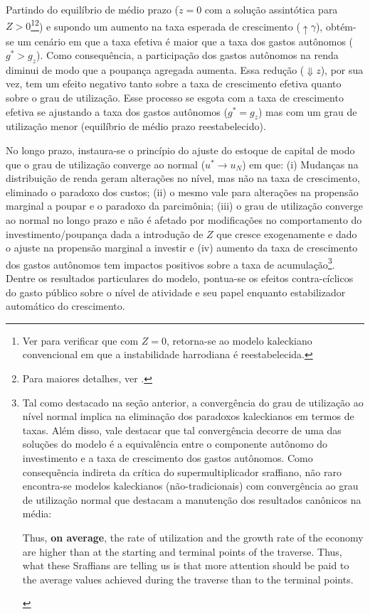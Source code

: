 Partindo do equilíbrio de médio prazo ($\dot z = 0$ com a solução assintótica para $Z >0$\footnote{Ver \textcite[Apêndice A]{allain_tackling_2015} para verificar que com $Z = 0$, retorna-se ao modelo kaleckiano convencional em que a instabilidade harrodiana é reestabelecida.}\footnote{Para maiores detalhes, ver \textcite{fagundes_role_2017}.}) e supondo um aumento na taxa esperada de crescimento ($\uparrow\gamma$), obtém-se um cenário em que a taxa efetiva é maior que a taxa dos gastos autônomos ($g^* > g_z$). Como consequência, a participação dos gastos autônomos na renda diminui de modo que  a poupança agregada aumenta. Essa redução ($\Downarrow z$), por sua vez, tem um efeito negativo tanto sobre a taxa de crescimento efetiva quanto sobre o grau de utilização. Esse processo se esgota com a taxa de crescimento efetiva se ajustando a taxa dos gastos autônomos ($g^* = g_z$) mas com um grau de utilização menor  (equilíbrio de médio prazo reestabelecido). 

No longo prazo, instaura-se o princípio do ajuste do estoque de capital de modo que o grau de utilização converge ao normal ($u^* \to u_N$) em que: (i) Mudanças na distribuição de renda geram alterações no nível, mas não na taxa de crescimento, eliminado o paradoxo dos custos; (ii) o mesmo vale para alterações na propensão marginal a poupar e o paradoxo da parcimônia; (iii) o grau de utilização converge ao normal no longo prazo e não é afetado por modificações no comportamento do investimento/poupança dada a introdução de $Z$ que cresce exogenamente e dado o ajuste na propensão marginal a investir e (iv) aumento da taxa de crescimento dos gastos autônomos tem impactos positivos sobre a taxa de acumulação\footnote{
	Tal como destacado na seção anterior, a convergência do grau de utilização ao nível normal implica na eliminação dos paradoxos kaleckianos em termos de taxas. Além disso, vale destacar que tal convergência decorre de uma das soluções do modelo é a equivalência entre o componente autônomo do investimento e a taxa de crescimento dos gastos autônomos. Como consequência indireta da crítica do supermultiplicador sraffiano, não raro encontra-se modelos kaleckianos (não-tradicionais) com convergência ao grau de utilização normal que destacam a manutenção dos resultados canônicos na média:
	
	\begin{citacao}
		Thus, \textbf{on average}, the rate of utilization and the growth rate of the
		economy are higher than at the starting and terminal points of the traverse. Thus, what
		these Sraffians are telling us is that more attention should be paid to the average values
		achieved during the traverse than to the terminal points.
		\cite[p.~408, grifos adicionados]{lavoie_post-keynesian_2015}
	\end{citacao}
	
}.  Dentre os resultados particulares do modelo, \textcite{allain_tackling_2015} pontua-se os efeitos contra-cíclicos do gasto público sobre o nível de atividade e seu papel enquanto estabilizador automático do crescimento.

